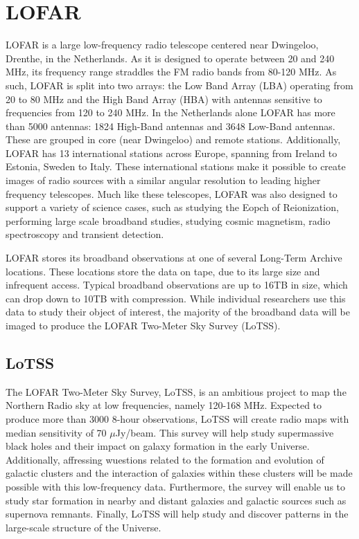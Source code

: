 \section{LOFAR}

\Gls{LOFAR} is a large low-frequency radio telescope centered near Dwingeloo, Drenthe, in the Netherlands\citep{vanHaarlem2013}.  As it is designed to operate between 20 and 240 MHz, its frequency range straddles the FM radio bands from 80-120 MHz. As such, LOFAR is split into two arrays: the Low Band Array (LBA) operating from 20 to 80 MHz and the High Band Array (HBA) with antennas sensitive to frequencies from 120 to 240 MHz. In the Netherlands alone LOFAR has more than 5000 antennas: 1824 High-Band antennas and 3648  Low-Band antennas. These are grouped in core (near Dwingeloo) and remote stations\citep{LOFAR_Stations}. Additionally, LOFAR has 13 international stations across Europe, spanning from Ireland to Estonia, Sweden to Italy\citep{lofar_brochure_2019}. These international stations make it possible to create images of radio sources with a similar angular resolution to leading higher frequency telescopes. Much like these telescopes, LOFAR was also designed to support a variety of science cases, such as studying the Eopch of Reionization\citep{patil2017upper}, performing large scale broadband studies\citep{LOTSS_DR2,lotss, MSSS}, studying cosmic magnetism, radio spectroscopy\citep{oonk2017, emig2019, Arias2018, salas2018} and transient detection\citep{lofar_trans1, lofar_trans2}.

LOFAR stores its broadband observations at one of several Long-Term Archive locations. These locations store the data on tape, due to its large size and infrequent access. Typical broadband observations are up to 16TB in size, which can drop down to 10TB with compression. While individual researchers use this data to study their object of interest, the majority of the broadband data will be imaged to produce the LOFAR Two-Meter Sky Survey (LoTSS). 


\subsection{LoTSS} 

The LOFAR Two-Meter Sky Survey, \Gls{LoTSS}\citep{lotss}, is an ambitious project to map the Northern Radio sky at low frequencies, namely 120-168 MHz. Expected to produce more than 3000 8-hour observations, LoTSS will create radio maps with median sensitivity of 70 $\mu$Jy/beam. This survey will help study supermassive black holes and their impact on galaxy formation in the early Universe. Additionally, affressing wuestions related to the formation and evolution of galactic clusters and the interaction of galaxies within these clusters will be made possible with this low-frequency data. Furthermore, the survey will enable us to study star formation in nearby and distant galaxies and galactic sources such as supernova remnants. Finally, LoTSS will help study and discover patterns in the large-scale structure of the Universe. 

